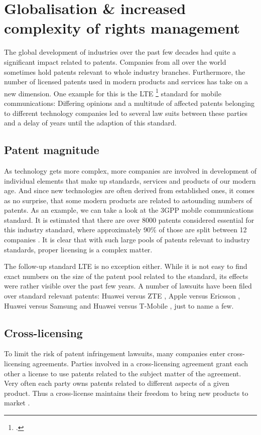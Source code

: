 \documentclass[a4paper]{report}
\begin{document}
\section{Globalisation \& increased complexity of rights management}
\label{sec:GlobalRightsMgmt}
The global development of industries over the past few decades had quite a significant impact related to patents. Companies from all over the world sometimes hold patents relevant to whole industry branches. Furthermore, the number of licensed patents used in modern products and services has take on a new dimension. One example for this is the LTE \footcite{Long Term Evolution} standard for mobile communications: Differing opinions and a multitude of affected patents belonging to different technology companies led to several law suits between these parties and a delay of years until the adaption of this standard.

\subsection{Patent magnitude}
As technology gets more complex, more companies are involved in development of individual elements that make up standards, services and products of our modern age. And since new technologies are often derived from established ones, it comes as no surprise, that some modern products are related to astounding numbers of patents. As an example, we can take a look at the 3GPP mobile communications standard. It is estimated that there are over 8000 patents considered essential for this industry standard, where approximately 90\% of those are split between 12 companies \parencite{Wiki3G}. It is clear that with such large pools of patents relevant to industry standards, proper licensing is a complex matter.

The follow-up standard LTE is no exception either. While it is not easy to find exact numbers on the size of the patent pool related to the standard, its effects were rather visible over the past few years. A number of lawsuits have been filed over standard relevant patents: Huawei versus ZTE \parencite{HuaweiVsZTE}, Apple versus Ericsson \parencite{AppleVsEricsson}, Huawei versus Samsung \parencite{HuaweiVsSamsung} and Huawei versus T-Mobile \parencite{HuaweiVsTmobile}, just to name a few.

\subsection{Cross-licensing}
To limit the risk of patent infringement lawsuits, many companies enter cross-licensing agreements. Parties involved in a cross-licensing agreement grant each other a license to use patents related to the subject matter of the agreement. Very often each party owns patents related to different aspects of a given product. Thus a cross-license maintains their freedom to bring new products to market \parencite{CrossLicense}.
\end{document}
